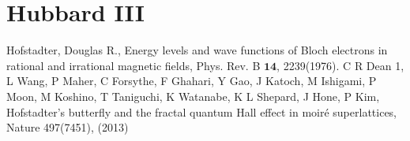 \documentclass[12pt]{jarticle}
\begin{document}
\section{Hubbard \rm{I}\hspace{-1pt}\rm{I}\hspace{-1pt}\rm{I}}


\begin{thebibliography}{9}
   Hofstadter, Douglas R., Energy levels and wave functions of Bloch electrons in rational and irrational magnetic fields, Phys. Rev. B $\bm{14}$, 2239(1976).
   C R Dean 1, L Wang, P Maher, C Forsythe, F Ghahari, Y Gao, J Katoch, M Ishigami, P Moon, M Koshino, T Taniguchi, K Watanabe, K L Shepard, J Hone, P Kim, Hofstadter's butterfly and the fractal quantum Hall effect in moiré superlattices, Nature 497(7451), (2013)
\end{thebibliography}
\end{document}
